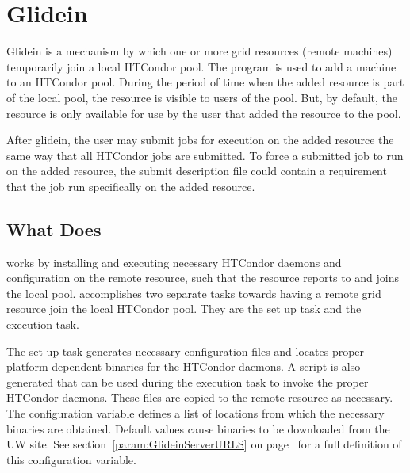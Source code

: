 \section{\label{sec:Glidein}Glidein}

Glidein is a mechanism by which one or more grid resources (remote machines)
temporarily join a local HTCondor pool. 
The program  is used to add a machine
to an HTCondor pool.
During the period of time when the added resource is
part of the local pool, the resource is visible 
to users of the pool.
But, by default, the resource is only available for
use by the user
that added the resource to the pool.

After glidein, the user may submit jobs for execution on the
added resource the same way that all HTCondor jobs are submitted.
To force a submitted job to run on the added resource, the
submit description file could contain a requirement that the job run 
specifically on the added resource.


\subsection{What  Does}

 works by installing and executing
necessary HTCondor daemons and configuration on the remote resource,
such that the resource reports to and joins the local pool.
 accomplishes two separate tasks towards
having a remote grid resource join the local HTCondor pool.
They are the set up task and the execution task.

The set up task generates necessary 
configuration files and locates proper platform-dependent
binaries for the HTCondor daemons.
A script is also generated that can be used during
the execution task to invoke the proper HTCondor daemons.
These files are copied to the remote resource as necessary.
The configuration variable 
defines a list of locations from which the necessary
binaries are obtained.
Default values cause binaries to be downloaded from the 
UW site.
See 
section~\ref{param:GlideinServerURLS} 
on page~\pageref{param:GlideinServerURLS}
for a full definition of this configuration variable.

